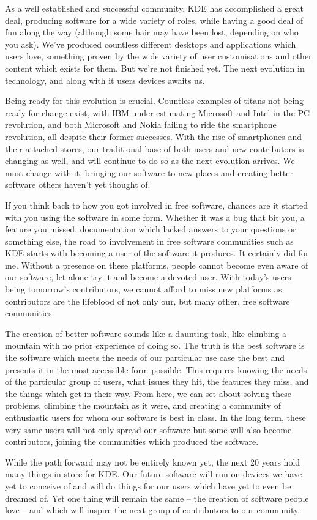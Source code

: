 

\noindent{}As a well established and successful community, KDE has accomplished a great deal, producing software for a wide variety of roles, while having a good deal of fun along the way (although some hair may have been lost, depending on who you ask). We've produced countless different desktops and applications which users love, something proven by the wide variety of user customisations and other content which exists for them. But we're not finished yet. The next evolution in technology, and along with it users devices awaits us.

Being ready for this evolution is crucial. Countless examples of titans not being ready for change exist, with IBM under estimating Microsoft and Intel in the PC revolution, and both Microsoft and Nokia failing to ride the smartphone revolution, all despite their former successes. With the rise of smartphones and their attached stores, our traditional base of both users and new contributors is changing as well, and will continue to do so as the next evolution arrives. We must change with it, bringing our software to new places and creating better software others haven't yet thought of.

If you think back to how you got involved in free software, chances are it started with you using the software in some form. Whether it was a bug that bit you, a feature you missed, documentation which lacked answers to your questions or something else, the road to involvement in free software communities such as KDE starts with becoming a user of the software it produces. It certainly did for me. Without a presence on these platforms, people cannot become even aware of our software, let alone try it and become a devoted user. With today's users being tomorrow's contributors, we cannot afford to miss new platforms  as contributors are the lifeblood of not only our, but many other, free software communities.

The creation of better software sounds like a daunting task, like climbing a mountain with no prior experience of doing so. The truth is the best software is the software which meets the needs of our particular use case the best and presents it in the most accessible form possible. This requires knowing the needs of the particular group of users, what issues they hit, the features they miss, and the things which get in their way. From here, we can set about solving these problems, climbing the mountain as it were, and creating a community of enthusiastic users for whom our software is best in class. In the long term, these very same users will not only spread our software but some will also become contributors, joining the communities which produced the software.

While the path forward may not be entirely known yet, the next 20 years hold many things in store for KDE. Our future software will run on devices we have yet to conceive of and will do things for our users which have yet to even be dreamed of. Yet one thing will remain the same – the creation of software people love – and which will inspire the next group of contributors to our community.